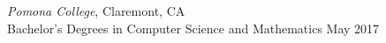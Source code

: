 {\sl Pomona College}, Claremont, CA \\
Bachelor's Degrees in Computer Science and Mathematics \hfill May 2017 \\
\vspace{-1em}
